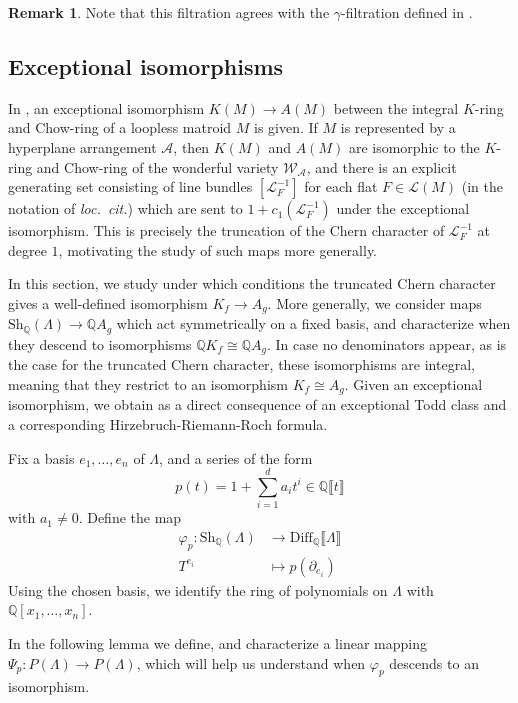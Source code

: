 \documentclass[oneside]{amsart}
\theoremstyle{plain}
\theoremstyle{definition}
\newtheorem{remark}[theorem]{Remark}
\newcommand{\Q}{{\mathbb{Q}}}
\newcommand{\cL}{{\mathcal{L}}}
\newcommand{\cA}{{\mathcal{A}}}
\newcommand{\Diff}{{\mathrm{Diff}}}
\newcommand{\Sh}{{\mathrm{Sh}}}
\newcommand{\mc}[1]{{\mathcal{#1}}}
\begin{document}
\begin{remark}
    Note that this filtration agrees with the $\gamma$-filtration defined in \cite[Ch. III]{FultonLang85}.
\end{remark}

\subsection{Exceptional isomorphisms}
\label{sec:exceptional-isoms}



In \cite{LLPP24}, an exceptional isomorphism $K(M)\to A(M)$ between the integral $K$-ring and Chow-ring of a loopless matroid $M$ is given. If $M$ is represented by a hyperplane arrangement $\cA$, then $K(M)$ and $A(M)$ are isomorphic to the $K$-ring and Chow-ring of the wonderful variety $\mc W_\cA$, and there is an explicit generating set consisting of line bundles $[\mc L_F^{-1}]$ for each flat $F \in \cL(M)$ (in the notation of \emph{loc.\ cit.}) which are sent to $1+c_1(\cL_F^{-1})$ under the exceptional isomorphism. This is precisely the truncation of the Chern character of $\cL_F^{-1}$ at degree $1$, motivating the study of such maps more generally.

In this section, we study under which conditions the truncated Chern character gives a well-defined isomorphism $K_f\to A_g$. More generally, we consider maps $\Sh_\Q(\Lambda) \to \Q A_g$ which act symmetrically on a fixed basis, and characterize when they descend to isomorphisms
$\Q K_f \cong \Q A_g$. 
In case no denominators appear, as is the case for the truncated Chern character, these isomorphisms are integral, meaning that they restrict to an isomorphism $K_f \cong A_g$. Given an exceptional isomorphism, we obtain as a direct consequence of  an exceptional Todd class and a corresponding Hirzebruch-Riemann-Roch formula.

Fix a basis $e_1, \dots, e_n$ of $\Lambda$, and a series of the form
\[
    p(t) = 1 + \sum_{i = 1}^d a_i t^i  \in \Q\llbracket t \rrbracket
\] with $a_1 \neq 0$.
Define the map
\begin{align*}
    \varphi_p: \Sh_\Q(\Lambda) &\to \Diff_\Q\llbracket \Lambda \rrbracket\\
    T^{e_i} &\mapsto p(\partial_{e_i})
\end{align*}
Using the chosen basis, we identify the ring of polynomials on $\Lambda$ with $\Q[x_1, \dots, x_n]$.

In the following lemma we define, and characterize a linear mapping $\Psi_p: P(\Lambda) \to P(\Lambda)$, which will help us understand when $\varphi_p$ descends to an isomorphism.
\end{document}
